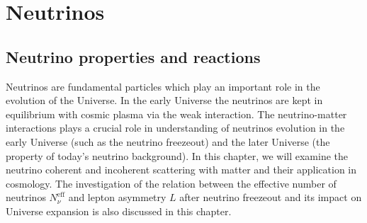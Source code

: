 \section{Neutrinos}\label{Neutrino}
\subsection{Neutrino properties and reactions}\label{ssec:nuproperties}
Neutrinos are fundamental particles which play an important role in the evolution of the Universe. In the early Universe the neutrinos are kept in equilibrium with cosmic plasma via the weak interaction. The neutrino-matter interactions plays a crucial role in  understanding of neutrinos evolution in the early Universe (such as the neutrino freezeout) and the later Universe (the property of today's neutrino background). In this chapter, we will examine the neutrino coherent and incoherent scattering with matter and their application in cosmology. The investigation of the relation between the effective number of neutrinos $N^{\mathrm{eff}}_\nu$ and lepton asymmetry $L$ after neutrino freezeout and its impact on Universe expansion is also discussed in this chapter. 



